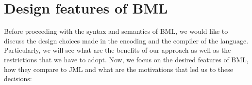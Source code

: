 \section{Design features of BML}\label{BML:design}
Before proceeding with the syntax and semantics 
of BML, we would like to discuss the design choices
 made in the encoding and the compiler of the language.
Particularly, we will see what are the benefits of our approach as 
well as the restrictions that we have to adopt.
Now, we focus on the desired features of BML, 
how  they compare to JML and what  are the motivations that led us to these decisions:




